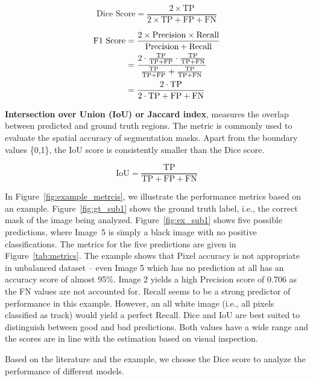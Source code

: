 \documentclass[Master,MDS,english]{BASE/twbook} %
\begin{document}
\[
\text{Dice Score} = \frac{2 \times \text{TP}}{2 \times \text{TP} + \text{FP} + \text{FN}}
\]

\begin{align*}
    \text{F1 Score} &= \frac{2 \times \text{Precision} \times \text{Recall}}{\text{Precision} + \text{Recall}} \\
    \vspace{1em}
     &= \frac{2 \cdot \frac{\text{TP}}{\text{TP} + \text{FP}} \cdot \frac{\text{TP}}{\text{TP} + \text{FN}}}{\frac{\text{TP}}{\text{TP} + \text{FP}} + \frac{\text{TP}}{\text{TP} + \text{FN}}} \\
    \vspace{1em}
     &= \frac{2 \cdot \text{TP}}{2 \cdot \text{TP} + \text{FP} + \text{FN}}
\end{align*}


\vspace{1cm}

\noindent\textbf{Intersection over Union (IoU) or Jaccard index}, measures the overlap between predicted and ground truth regions. The metric is commonly used to evaluate the spatial accuracy of segmentation masks. Apart from the boundary values \{0,1\}, the IoU score is consistently smaller than the Dice score.

\[
\text{IoU} = \frac{\text{TP}}{\text{TP} + \text{FP} + \text{FN}}
\]

\vspace{1cm}

In Figure~\ref{fig:example_metrcis}, we illustrate the performance metrics based on an example. Figure~\ref{fig:gt_sub1} shows the ground truth label, i.e., the correct mask of the image being analyzed. Figure~\ref{fig:ex_sub1} shows five possible predictions, where Image~5 is simply a black image with no positive classifications. The metrics for the five predictions are given in Figure~\ref{tab:metrics}. The example shows that Pixel accuracy is not appropriate in unbalanced dataset -- even Image 5 which has no prediction at all has an accuracy score of almost 95\%. Image 2 yields a high Precision score of 0.706 as the FN values are not accounted for.  Recall seems to be a strong predictor of performance in this example. However, an all white image (i.e., all pixels classified as track) would yield a perfect Recall. Dice and IoU are best suited to distinguish between good and bad predictions. Both values have a wide range and the scores are in line with the estimation based on visual inspection.

Based on the literature and the example, we choose the Dice score to analyze the performance of different models.
\end{document}
